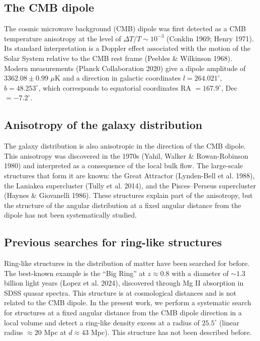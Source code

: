 \documentclass[11pt,a4paper]{article}
\begin{document}
\subsection{The CMB dipole}

The cosmic microwave background (CMB) dipole was first detected as a CMB
temperature anisotropy at the level of \(\Delta T/T \sim 10^{-3}\)
(Conklin 1969; Henry 1971). Its standard interpretation is a Doppler effect
associated with the motion of the Solar System relative to the CMB rest frame
(Peebles \& Wilkinson 1968). Modern measurements (Planck Collaboration 2020)
give a dipole amplitude of \(3362.08 \pm 0.99\) \(\mu\)K and a direction in
galactic coordinates \(l = 264.021^\circ\), \(b = 48.253^\circ\),
which corresponds to equatorial coordinates RA \(= 167.9^\circ\),
Dec \(= -7.2^\circ\).

\subsection{Anisotropy of the galaxy distribution}

The galaxy distribution is also anisotropic in the direction of the CMB dipole.
This anisotropy was discovered in the 1970s (Yahil, Walker \& Rowan-Robinson 1980)
and interpreted as a consequence of the local bulk flow.
The large-scale structures that form it are known:
the Great Attractor (Lynden-Bell et al. 1988), the Laniakea supercluster
(Tully et al. 2014), and the Pisces--Perseus supercluster
(Haynes \& Giovanelli 1986). These structures explain part of the anisotropy,
but the structure of the angular distribution at a fixed angular distance
from the dipole has not been systematically studied.

\subsection{Previous searches for ring-like structures}

Ring-like structures in the distribution of matter have been searched for
before. The best-known example is the ``Big Ring'' at \(z \approx 0.8\)
with a diameter of \(\sim 1.3\) billion light years (Lopez et al. 2024),
discovered through Mg II absorption in SDSS quasar spectra.
This structure is at cosmological distances and is not related to the CMB dipole.
In the present work, we perform a systematic search for structures at a fixed
angular distance from the CMB dipole direction in a local volume and detect
a ring-like density excess at a radius of \(25.5^\circ\) (linear radius
\(\approx 20\) Mpc at \(d \approx 43\) Mpc). This structure has not been
described before.
\end{document}
